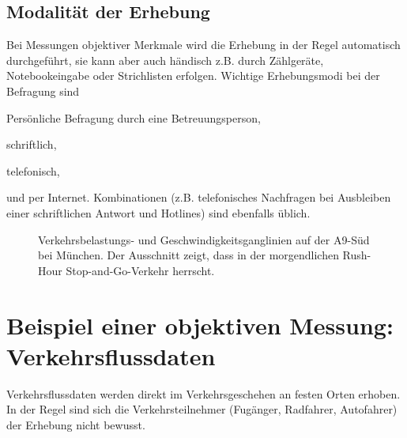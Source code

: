 \subsection{Modalit\"at der Erhebung}

Bei Messungen objektiver Merkmale
wird die Erhebung in der Regel automatisch durch\-gef\"uhrt, sie kann
aber auch h\"andisch z.B. durch Z\"ahlger\"ate, Notebookeingabe oder Strichlisten
erfolgen. Wichtige Erhebungsmodi bei der Befragung sind 
\bi
\item Pers\"onliche Befragung durch eine Betreuungsperson,
\item schriftlich,
\item telefonisch,
\item und per Internet.
\ei
Kombinationen (z.B. telefonisches Nachfragen bei Ausbleiben einer
schriftlichen Antwort und Hotlines) sind ebenfalls \"ublich.



\begin{figure}
\caption{\label{fig:ganglinien}Verkehrsbelastungs- und
Geschwindigkeitsganglinien auf der A9-S\"ud bei M\"unchen. Der
Ausschnitt zeigt, dass in der morgendlichen Rush-Hour
Stop-and-Go-Verkehr herrscht.
}
\end{figure}

\section{\label{sec:erh-fluss}Beispiel einer objektiven Messung: Verkehrsflussdaten}

Verkehrsflussdaten werden direkt im Verkehrsgeschehen an festen
Orten erhoben. In der Regel sind sich die Verkehrsteilnehmer
(Fu\3g\"anger, Radfahrer, Autofahrer) der Erhebung
nicht bewusst.

